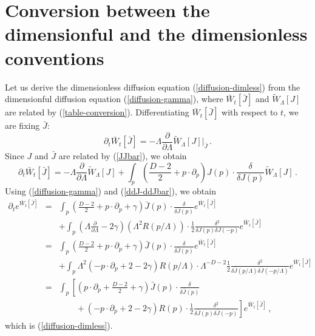 \documentclass[aps,prd,preprint,groupedaddress,preprintnumbers,longbibliography]{revtex4-1}
\newcommand{\nn}{\nonumber}
\begin{document}
\section{Conversion between the dimensionful and the dimensionless
  conventions\label{appendix-conversion}}

Let us derive the dimensionless diffusion equation
(\ref{diffusion-dimless}) from the dimensionful diffusion equation
(\ref{diffusion-gamma}), where $\bar{W}_t [\bar{J}]$ and
$\tilde{W}_\Lambda [J]$ are related by (\ref{table-conversion}).
Differentiating $\bar{W}_t [\bar{J}]$ with respect to $t$, we are fixing
$\bar{J}$:
\begin{equation}
\partial_t \bar{W}_t [\bar{J}] = - \Lambda \frac{\partial}{\partial
  \Lambda} \tilde{W}_\Lambda [J] \Big|_{\bar{J}}\,.
\end{equation}
Since $J$ and $\bar{J}$ are related by (\ref{JJbar}), we obtain
\begin{equation}
\partial_t \bar{W}_t [\bar{J}] =  - \Lambda \frac{\partial}{\partial
  \Lambda} \tilde{W}_\Lambda [J] + \int_p \left( \frac{D-2}{2} + p
  \cdot \partial_p \right) J(p)\cdot \frac{\delta}{\delta J(p)}
\tilde{W}_\Lambda [J]\,.
\end{equation}
Using (\ref{diffusion-gamma}) and (\ref{ddJ-ddJbar}), we obtain
\begin{eqnarray}
\partial_t e^{\bar{W}_t [\bar{J}]} &=& \int_p 
\left(\frac{D-2}{2} + p \cdot \partial_p + \gamma \right) \bar{J} (p)
\cdot \frac{\delta}{\delta \bar{J} (p)} e^{\bar{W}_t [\bar{J}]}\nn\\
&& + \int_p \left(\Lambda \frac{\partial}{\partial \Lambda} - 2 \gamma
\right) \left(\Lambda^2 R(p/\Lambda)\right) \cdot \frac{1}{2}
\frac{\delta^2}{\delta J(p) \delta J(-p)} e^{\bar{W}_t [\bar{J}]}\nn\\
&=& \int_p 
\left(\frac{D-2}{2} + p \cdot \partial_p + \gamma \right) \bar{J} (p)
\cdot \frac{\delta}{\delta \bar{J} (p)} e^{\bar{W}_t [\bar{J}]}\nn\\
&& + \int_p \Lambda^2 \left(- p \cdot \partial_p + 2 - 2 \gamma
\right) R(p/\Lambda) \cdot \Lambda^{-D-2} \frac{1}{2}
\frac{\delta^2}{\delta \bar{J} (p/\Lambda) \delta \bar{J}
  (-p/\Lambda)}  e^{\bar{W}_t [\bar{J}]} \nn\\
&=& \int_p \left[ \left( p \cdot \partial_p +
\frac{D-2}{2} + \gamma\right) \bar{J} (p)
\cdot \frac{\delta}{\delta \bar{J} (p)} \right.\nn\\
&& \left.\qquad + \left( - p \cdot \partial_p + 2 - 2\gamma\right) R(p)
  \cdot \frac{1}{2} \frac{\delta^2}{\delta \bar{J} (p) \delta \bar{J}
    (-p)} \right]  e^{\bar{W}_t [\bar{J}]}\,,
\end{eqnarray}
which is (\ref{diffusion-dimless}).
\end{document}
